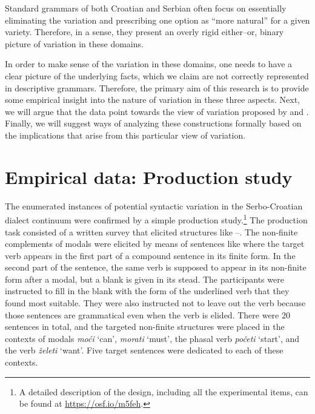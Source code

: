 \documentclass[output=paper,modfonts,newtxmath,hidelinks,]{langscibook}
\begin{document}
\ea \label{7:ex4}
	\z
\z

\noindent Standard grammars of both Croatian and Serbian often focus on essentially eliminating the variation and prescribing one option as ``more natural'' for a given variety. Therefore, in a sense, they present an overly rigid either--or, binary picture of variation in these domains.

In order to make sense of the variation in these domains, one needs to have a clear picture of the underlying facts, which we claim are not correctly represented in descriptive grammars. Therefore, the primary aim of this research is to provide some empirical insight into the nature of variation in these three aspects. Next, we will argue that the data point towards the view of variation proposed by  \citet{AdgerTrousdale2007} and \citet{AdgerSmith2005}. Finally, we will suggest ways of analyzing these constructions formally based on the implications that arise from this particular view of variation.

\section{Empirical data: Production study}\label{7:s2}

The enumerated instances of potential syntactic variation in the Serbo-Croatian dialect continuum were confirmed by a simple production study.\footnote{\label{7:fn1}A detailed description of the design, including all the experimental items, can be found at \url{https://osf.io/m5feh}.} The production task consisted of a written survey that elicited structures like --. The non-finite complements of modals were elicited by means of sentences like  where the target verb appears in the first part of a compound sentence in its finite form. In the second part of the sentence, the same verb is supposed to appear in its non-finite form after a modal, but a blank is given in its stead. The participants were instructed to fill in the blank with the form of the underlined verb that they found most suitable. They were also instructed not to leave out the verb because those sentences are grammatical even when the verb is elided. There were 20 sentences in total, and the targeted non-finite structures were placed in the contexts of modals \textit{moći} `can', \textit{morati} `must', the phasal verb \textit{početi} `start', and the verb \textit{želeti} `want'. Five target sentences were dedicated to each of these contexts.\largerpage[2]
\end{document}
